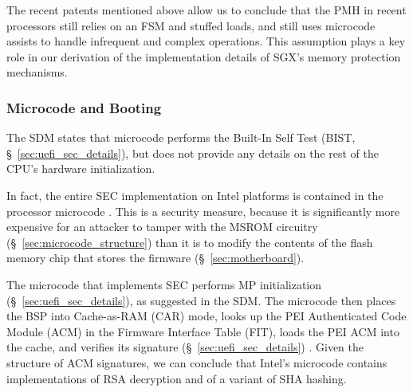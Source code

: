 The recent patents mentioned above allow us to conclude that the PMH in recent
processors still relies on an FSM and stuffed loads, and still uses microcode
assists to handle infrequent and complex operations. This assumption plays a
key role in our derivation of the implementation details of SGX's memory
protection mechanisms.


\subsubsection{Microcode and Booting}
\label{microcode:sec}

The SDM states that microcode performs the Built-In Self Test (BIST,
\S~\ref{sec:uefi_sec_details}), but does not provide any details on the
rest of the CPU's hardware initialization.




In fact, the entire SEC implementation on Intel platforms is contained in the
processor microcode \cite{datta2010trustedboot, datta2013acm, intel2014vapic}.
This is a security measure, because  it is significantly more expensive for an
attacker to tamper with the MSROM circuitry (\S~\ref{sec:microcode_structure})
than it is to modify the contents of the flash memory chip that stores the
firmware (\S~\ref{sec:motherboard}).

The microcode that implements SEC performs MP initialization
(\S~\ref{sec:uefi_sec_details}), as suggested in the SDM. The microcode then
places the BSP into Cache-as-RAM (CAR) mode, looks up the PEI Authenticated
Code Module (ACM) in the Firmware Interface Table (FIT), loads the PEI ACM into
the cache, and verifies its signature (\S~\ref{sec:uefi_sec_details})
\cite{datta2010trustedboot, intel2012patching, intel2012uefihypervisor,
intel2012ltsx, datta2013acm}. Given the structure of ACM signatures, we can
conclude that Intel's microcode contains implementations of RSA decryption and
of a variant of SHA hashing.

